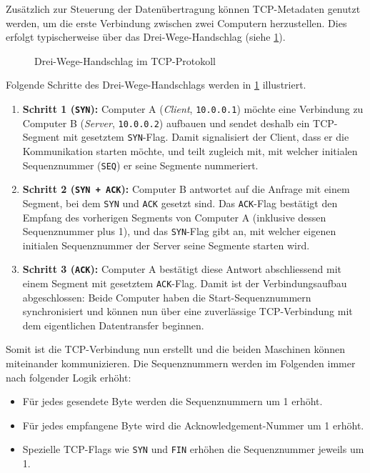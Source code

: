 Zusätzlich zur Steuerung der Datenübertragung können \gls{TCP}-Metadaten genutzt werden, um die erste Verbindung zwischen zwei Computern herzustellen. Dies erfolgt typischerweise über das Drei-Wege-Handschlag (siehe \cref{fig:threewayHandshake}).

\begin{figure}[H]
	\centering
	
	\caption{Drei-Wege-Handschlag im \gls{TCP}-Protokoll}
	\label{fig:threewayHandshake}
\end{figure}
Folgende Schritte des Drei-Wege-Handschlags werden in \cref{fig:threewayHandshake} illustriert.
\begin{enumerate}
	\item \textbf{Schritt 1 (\texttt{SYN}):} Computer A (\textit{Client}, \texttt{10.0.0.1}) möchte eine Verbindung zu Computer B (\textit{Server}, \texttt{10.0.0.2}) aufbauen und sendet deshalb ein \gls{TCP}-Segment mit gesetztem \texttt{SYN}-Flag. Damit signalisiert der Client, dass er die Kommunikation starten möchte, und teilt zugleich mit, mit welcher initialen Sequenznummer (\texttt{SEQ}) er seine Segmente nummeriert.
	\item \textbf{Schritt 2 (\texttt{SYN + ACK}):} Computer B antwortet auf die Anfrage mit einem Segment, bei dem \texttt{SYN} und \texttt{ACK} gesetzt sind. Das \texttt{ACK}-Flag bestätigt den Empfang des vorherigen Segments von Computer A (inklusive dessen Sequenznummer plus 1), und das \texttt{SYN}-Flag gibt an, mit welcher eigenen initialen Sequenznummer der Server seine Segmente starten wird.
	\item \textbf{Schritt 3 (\texttt{ACK}):} Computer A bestätigt diese Antwort abschliessend mit einem Segment mit gesetztem \texttt{ACK}-Flag. Damit ist der Verbindungsaufbau abgeschlossen: Beide Computer haben die Start-Sequenznummern synchronisiert und können nun über eine zuverlässige \gls{TCP}-Verbindung mit dem eigentlichen Datentransfer beginnen.
\end{enumerate}
Somit ist die \gls{TCP}-Verbindung nun erstellt und die beiden Maschinen können miteinander kommunizieren. Die Sequenznummern werden im Folgenden immer nach folgender Logik erhöht:

\begin{itemize}
	\item Für jedes gesendete Byte werden die Sequenznummern um 1 erhöht.
	\item Für jedes empfangene Byte wird die Acknowledgement-Nummer um 1 erhöht.
	\item Spezielle \gls{TCP}-Flags wie \texttt{SYN} und \texttt{FIN} erhöhen die Sequenznummer jeweils um 1.
\end{itemize}

